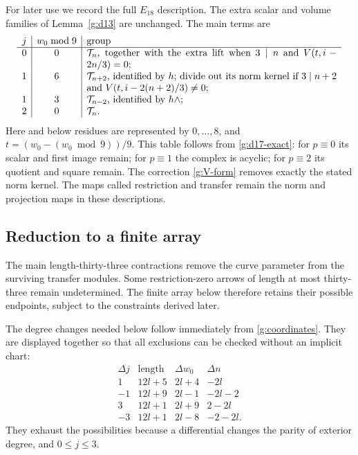For later use we record the full $E_{18}$ description.  The
extra scalar and volume families of Lemma~\ref{g:d13} are
unchanged.  The main terms are
\begin{equation}\label{g:E18}
\begin{array}{c|c|p{9.1cm}}
 j&w_0\bmod9&\text{group}\\\hline
 0&0&$\mathcal T_n$, together with the extra lift when
 $3\mid n$ and $V(t,i-2n/3)=0$;\\
 1&6&$\mathcal T_{n+2}$, identified by $h$; divide out its
 norm kernel if $3\mid n+2$ and
 $V(t,i-2(n+2)/3)\ne0$;\\
 1&3&$\mathcal T_{n-2}$, identified by $h\wedge$;\\
 2&0&$\mathcal T_n$.
\end{array}
\end{equation}
Here and below residues are represented by $0,\ldots,8$, and
$t=(w_0-(w_0\bmod9))/9$.  This table follows from
\eqref{g:d17-exact}: for $p\equiv0$ its scalar and first
image remain; for $p\equiv1$ the complex is acyclic;
for $p\equiv2$ its quotient and square remain.  The
correction \eqref{g:V-form} removes exactly the stated
norm kernel.  The maps called restriction and transfer
remain the norm and projection maps in these descriptions.

\subsection{Reduction to a finite array}

The main length-thirty-three contractions remove the curve parameter
from the surviving transfer modules. Some restriction-zero arrows of
length at most thirty-three remain undetermined. The finite array below
therefore retains their possible endpoints, subject to the constraints
derived later.

The degree changes needed below follow immediately from
\eqref{g:coordinates}.  They are displayed together so that
all exclusions can be checked without an implicit chart:
\begin{equation}\label{g:raw-lengths}
\begin{array}{c|c|c|c}
 \Delta j&\text{length}&\Delta w_0&\Delta n\\\hline
 1&12l+5&2l+4&-2l\\
 -1&12l+9&2l-1&-2l-2\\
 3&12l+1&2l+9&2-2l\\
 -3&12l+1&2l-8&-2-2l.
\end{array}
\end{equation}
They exhaust the possibilities because a differential changes
the parity of exterior degree, and $0\le j\le3$.

